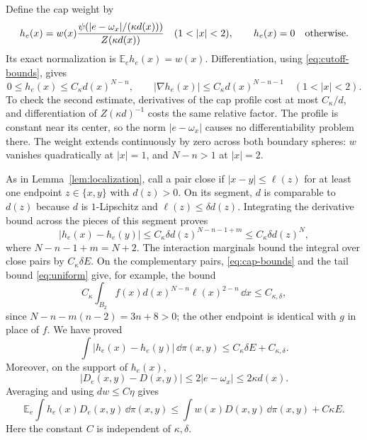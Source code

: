 Define the cap weight by
\begin{equation}\label{eq:cap-weight}
 h_e(x)=w(x)\frac{\psi(|e-\omega_x|/(\kappa d(x)))}{Z(\kappa d(x))}
 \quad(1<|x|<2),\qquad h_e(x)=0\quad\hbox{otherwise}.
\end{equation}
Its exact normalization is $\mathbb E_e h_e(x)=w(x)$.  Differentiation,
using \eqref{eq:cutoff-bounds}, gives
\begin{equation}\label{eq:cap-bounds}
 0\le h_e(x)\le C_\kappa d(x)^{N-n},\qquad
 |\nabla h_e(x)|\le C_\kappa d(x)^{N-n-1}
 \quad(1<|x|<2).
\end{equation}
To check the second estimate, derivatives of the cap profile cost at
most $C_\kappa/d$, and differentiation of $Z(\kappa d)^{-1}$ costs
the same relative factor.  The profile is constant near its center,
so the norm $|e-\omega_x|$ causes no differentiability problem there.
The weight extends continuously by zero across both boundary spheres:
$w$ vanishes quadratically at $|x|=1$, and $N-n>1$ at $|x|=2$.

As in Lemma~\ref{lem:localization}, call a pair close if
$|x-y|\le\ell(z)$ for at least one endpoint $z\in\{x,y\}$ with
$d(z)>0$.  On its segment, $d$ is comparable to $d(z)$ because $d$
is $1$-Lipschitz and $\ell(z)\le\delta d(z)$.  Integrating the
derivative bound across the pieces of this segment proves
\begin{equation}\label{eq:cap-oscillation}
 |h_e(x)-h_e(y)|
 \le C_\kappa\delta d(z)^{N-n-1+m}
 \le C_\kappa\delta d(z)^N,
\end{equation}
where $N-n-1+m=N+2$.  The interaction marginals bound the integral
over close pairs by $C_\kappa\delta E$.
On the complementary pairs, \eqref{eq:cap-bounds} and the tail bound
\eqref{eq:uniform} give, for example, the bound
\[
 C_\kappa\int_{B_2}f(x)d(x)^{N-n}\ell(x)^{2-n}\,\dd x
 \le C_{\kappa,\delta},
\]
since $N-n-m(n-2)=3n+8>0$; the other endpoint is identical with
$g$ in place of $f$.  We have proved
\begin{equation}\label{eq:cap-mismatch}
 \int|h_e(x)-h_e(y)|\,\dd\pi(x,y)
 \le C_\kappa\delta E+C_{\kappa,\delta}.
\end{equation}
Moreover, on the support of $h_e(x)$,
\[
 |D_e(x,y)-D(x,y)|\le2|e-\omega_x|\le2\kappa d(x).
\]
Averaging and using $dw\le C\eta$ gives
\begin{equation}\label{eq:cap-pressure}
 \mathbb E_e\int h_e(x)D_e(x,y)\,\dd\pi(x,y)
 \le\int w(x)D(x,y)\,\dd\pi(x,y)+C\kappa E.
\end{equation}
Here the constant $C$ is independent of $\kappa,\delta$.

